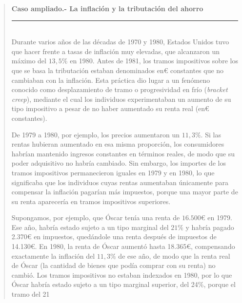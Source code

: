 \documentclass[10pt,a4paper]{article}
\newenvironment{specialblock}[1]{%
      \begin{quote} %
      \small %
      \noindent\textbf{#1}\\[-0.3em] %
      \rule{\linewidth}{0.4pt}\\[0.6em]}{
      \end{quote}}
\begin{document}
\begin{specialblock}{\textbf{Caso ampliado.-} La inflación y la tributación del ahorro}
    Durante varios años de las décadas de 1970 y 1980, Estados Unidos tuvo que hacer frente a tasas de inflación muy elevadas, que alcanzaron un máximo del $13,5\%$ en 1980. Antes de 1981, los tramos impositivos sobre los que se basa la tributación estaban denominados en€ constantes que no cambiaban con la inflación. Esta práctica dio lugar a un fenómeno conocido como desplazamiento de tramo o progresividad en frío (\textit{bracket creep}), mediante el cual los individuos experimentaban un aumento de su tipo impositivo a pesar de no haber aumentado su renta real (en€ constantes).

    De 1979 a 1980, por ejemplo, los precios aumentaron un $11,3\%$. Si las rentas hubieran aumentado en esa misma proporción, los consumidores habrían mantenido ingresos constantes en términos reales, de modo que su poder adquisitivo no habría cambiado. Sin embargo, los importes de los tramos impositivos permanecieron iguales en 1979 y en 1980, lo que significaba que los individuos cuyas rentas aumentaban únicamente para compensar la inflación pagarían más impuestos, porque una mayor parte de su renta aparecería en tramos impositivos superiores.
    
    Supongamos, por ejemplo, que Óscar tenía una renta de $16.500€$ en 1979. Ese año, habría estado sujeto a un tipo marginal del $21\%$ y habría pagado 2.370€ en impuestos, quedándole una renta después de impuestos de 14.130€. En 1980, la renta de Óscar aumentó hasta 18.365€, compensando exactamente la inflación del $11,3\%$ de ese año, de modo que la renta real de Óscar (la cantidad de bienes que podía comprar con su renta) no cambió. Los tramos impositivos no estaban indexados en 1980, por lo que Óscar habría estado sujeto a un tipo marginal superior, del 24\%, porque el tramo del 21 %
    

\end{specialblock}
\end{document}
